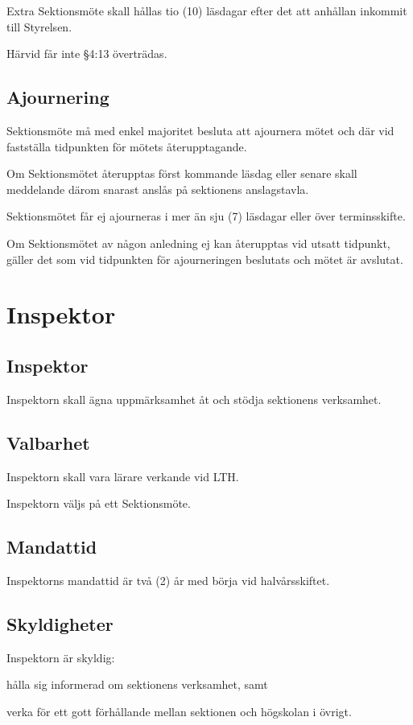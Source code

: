 \documentclass[10pt]{article}
\begin{document}
Extra Sektionsmöte skall hållas tio (10) läsdagar efter det att anhållan
inkommit till Styrelsen.

Härvid får inte §4:13 överträdas.

\subsection{Ajournering}
Sektionsmöte må med enkel majoritet besluta att ajournera mötet och där vid
fastställa tidpunkten för mötets återupptagande.

Om Sektionsmötet återupptas först kommande läsdag eller senare skall
meddelande därom snarast anslås på sektionens anslagstavla.

Sektionsmötet får ej ajourneras i mer än sju (7) läsdagar eller över
terminsskifte.

Om Sektionsmötet av någon anledning ej kan återupptas vid utsatt tidpunkt,
gäller det som vid tidpunkten för ajourneringen beslutats och mötet är
avslutat.
\newpage

\section{Inspektor}
\subsection{Inspektor}
Inspektorn skall ägna uppmärksamhet åt och stödja sektionens verksamhet.

\subsection{Valbarhet}
Inspektorn skall vara lärare verkande vid LTH.

Inspektorn väljs på ett Sektionsmöte.

\subsection{Mandattid}
Inspektorns mandattid är två (2) år med börja vid halvårsskiftet.

\subsection{Skyldigheter}
Inspektorn är skyldig:
\begin{attlist}
\item hålla sig informerad om sektionens verksamhet, samt
\item verka för ett gott förhållande mellan sektionen och högskolan i övrigt.
\end{attlist}
\end{document}
